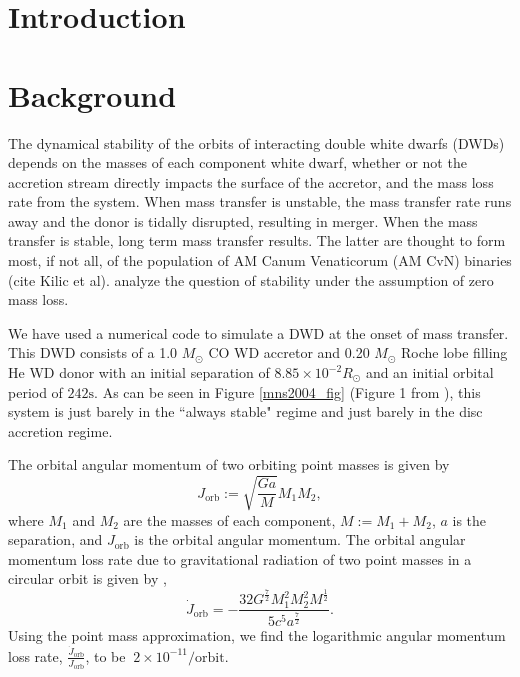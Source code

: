 \documentclass[preprint]{aastex}
\begin{document}
\newcommand{\fig}[1]{Figure \ref{#1}}
\newcommand{\eq}[1]{equation (\ref{#1})}
\newcommand{\eqs}[2]{equations (\ref{#1}) - (\ref{#2})}
\newcommand{\Eqs}[2]{Equations (\ref{#1}) - (\ref{#2})}
\newcommand{\vc}[1]{ {\bf{#1}} }
\newcommand{\grad}[1]{ \vc{\nabla } #1 }
\newcommand{\dv}[1]{ \vc{\nabla } \cdot #1 }
\newcommand{\dt}[1]{ \frac{\partial}{\partial t} #1 }
\newcommand{\dx}[2]{ \frac{\partial}{\partial #1} #2 }

\section{Introduction}

\section{Background}
The dynamical stability of the orbits of interacting double white dwarfs (DWDs) depends on the masses of each component white dwarf, whether 
or not the accretion stream directly impacts the surface of the accretor, and the mass loss rate from the system. When mass transfer is unstable,
 the mass transfer rate runs away and the donor is tidally disrupted, resulting in merger. When the mass transfer is stable, long term mass transfer results. 
The latter are thought to form most, if not all, of the population of AM Canum Venaticorum (AM CvN) binaries (cite Kilic et al). \cite{MNS2004} analyze the 
question of stability under the assumption of zero mass loss.

We have used a numerical code to simulate a DWD at the onset of mass transfer. This DWD consists of a 1.0 $M_{\odot}$ CO WD accretor and 0.20 $M_{\odot}$ Roche lobe filling He WD donor with an initial 
separation of $8.85 \times 10^{-2} R_{\odot}$ and an initial orbital period of $242 \mathrm{s}$. 
As can be seen in \fig{mns2004_fig} (Figure 1 from \cite{MNS2004}), this system is just barely in the ``always stable" regime and just barely in the disc accretion regime. 

The orbital angular momentum of two orbiting point masses is given by 
\begin{equation}
\label{jorb}
J_\mathrm{orb} := \sqrt{\frac{G a}{M}} M_1 M_2,
\end{equation}
where $M_1$ and $M_2$ are the masses of each component, $M := M_1 + M_2$, $a$ is the separation, and $J_\mathrm{orb}$ is the orbital angular momentum.
The orbital angular momentum loss rate due to gravitational radiation of two point masses in a circular orbit is given by \cite{P1964},
\begin{equation}
\label{grad}
\dot{J}_\mathrm{orb} = -\frac{32 G^\frac{7}{2} M_1^2 M_2^2 M^\frac{1}{2}}{5 c^5 a^\frac{7}{2} }.
\end{equation}
Using the point mass approximation, we find the logarithmic angular momentum loss rate, $\frac{\dot{J}_\mathrm{orb}}{J_\mathrm{orb}}$, to be $~2 \times 10^{-11} / \mathrm{orbit}$.
\end{document}
